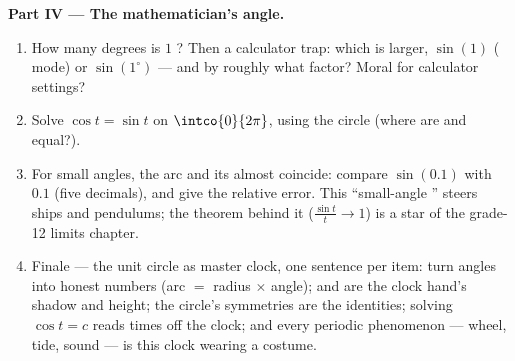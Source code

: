 \begin{problem}
\medskip
\noindent\textbf{Part IV --- The mathematician's angle.}
\begin{enumerate}[resume]
  \item How many degrees is $1$ ? Then a calculator trap:
        which is larger, $\sin(1)$ ( mode) or
        $\sin(1^\circ)$ --- and by roughly what factor? Moral
        for calculator settings?
  \item Solve $\cos t = \sin t$ on $\intco{0}{2\pi}$, using the
        circle (where are  and  equal?).
  \item For small angles, the arc and its  almost coincide:
        compare $\sin(0.1)$ with $0.1$ (five decimals), and
        give the relative error. This ``small-angle
        '' steers ships and pendulums; the theorem
        behind it ($\frac{\sin t}{t} \to 1$) is a star of the
        grade-12 limits chapter.
  \item Finale --- the unit circle as master clock, one sentence
        per item:  turn angles into honest numbers (arc
        $=$ radius $\times$ angle);  and  are the
        clock hand's shadow and height; the circle's symmetries
        are the identities; solving $\cos t = c$ reads times
        off the clock; and every periodic phenomenon --- wheel,
        tide, sound --- is this clock wearing a costume.
\end{enumerate}
\end{problem}

